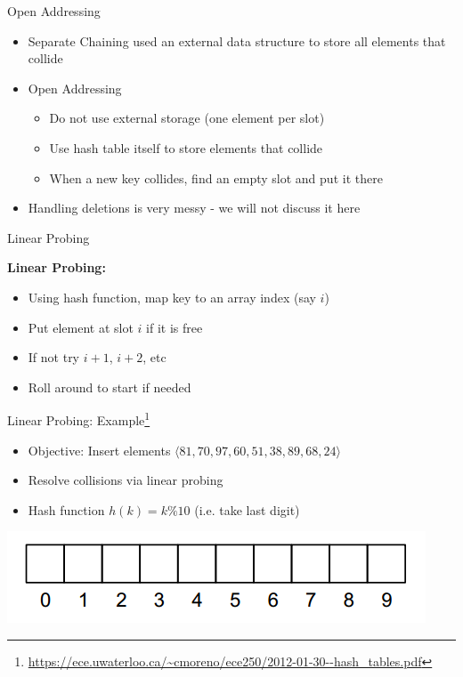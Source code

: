 \documentclass{beamer}
\begin{document}
\begin{frame}{Open Addressing}
    \begin{itemize}
        \item Separate Chaining used an external data structure to store all elements that collide
        \item Open Addressing 
        \begin{itemize}
            \item Do not use external storage (one element per slot)
            \item Use hash table itself to store elements that collide
            \item When a new key collides, find an empty slot and put it there
        \end{itemize}
        \item Handling deletions is very messy - we will not discuss it here
    \end{itemize}
\end{frame}

\begin{frame}{Linear Probing}

    {\bf Linear Probing:}
    \begin{itemize}
        \item Using hash function, map key to an array index (say $i$)
        \item Put element at slot $i$ if it is free
        \item If not try $i+1$, $i+2$, etc
        \item Roll around to start if needed
    \end{itemize}
\end{frame}

\begin{frame}{Linear Probing: Example\footnote{\url{https://ece.uwaterloo.ca/~cmoreno/ece250/2012-01-30--hash_tables.pdf}}}
    \begin{itemize}
        \item Objective: Insert elements $\langle 81, 70, 97, 60, 51, 38, 89, 68, 24 \rangle$ 
        \item Resolve collisions via linear probing 
        \item Hash function $h(k) = k \% 10$ (i.e. take last digit)
    \end{itemize}
    \begin{center}
        \includegraphics[scale=0.5]{linearProbing1.png}
    \end{center}
\end{frame}
\end{document}
